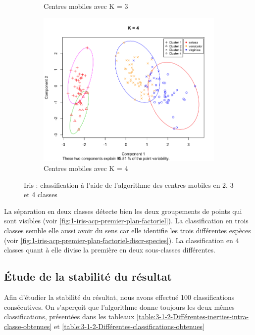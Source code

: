 \documentclass[a4paper,10pt]{report}
\begin{document}
\begin{figure}[H]
\begin{subfigure}[b]{0.33\linewidth}
		\caption{\small Centres mobiles avec K = 3}
		\label{fig:3-1-1-iris-kmeans-3}
	\end{subfigure}%
	\begin{subfigure}[b]{0.33\linewidth}
		\centering
		\captionsetup{justification=centering}
		\includegraphics[width=1\linewidth]{img/3-1-1-iris-kmeans-4}
		\caption{\small Centres mobiles avec K = 4}
		\label{fig:3-1-1-iris-kmeans-4}
	\end{subfigure}%
	\caption{\small Iris : classification à l'aide de l'algorithme des centres mobiles en 2, 3 et 4 classes}
	\label{fig:3-1-1-kmeans-iris-en-2-3-4-classes}%
\end{figure}


La séparation en deux classes détecte bien les deux groupements de points qui sont visibles (voir \autoref{fig:1-iris-acp-premier-plan-factoriel}). La classification en trois classes semble elle aussi avoir du sens car elle identifie les trois différentes espèces (voir \autoref{fig:1-iris-acp-premier-plan-factoriel-discr-species}). La classification en 4 classes quant à elle divise la première en deux sous-classes différentes.

\subsection{Étude de la stabilité du résultat}

Afin d'étudier la stabilité du résultat, nous avons effectué 100 classifications consécutives. On s'aperçoit que l'algorithme donne toujours les deux mêmes classifications, présentées dans les tableaux \autoref{table:3-1-2-Différentes-inerties-intra-classe-obtenues} et \autoref{table:3-1-2-Différentes-classifications-obtenues}
\end{document}
